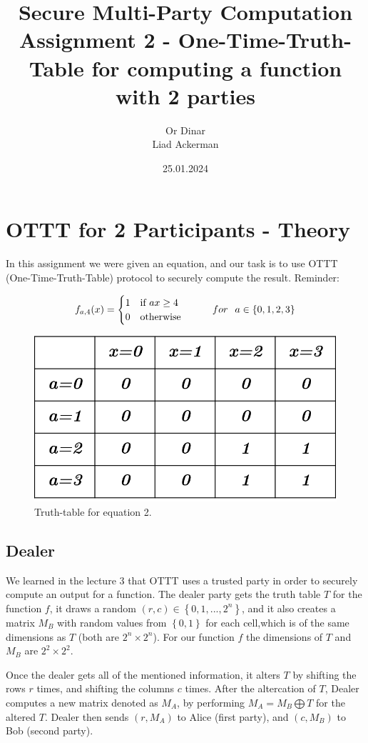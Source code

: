 \documentclass{article}
\title{\textbf{Secure Multi-Party Computation
} \hspace{10cm} 
Assignment 2 - One-Time-Truth-Table for computing a function with 2 parties\textbf{}}
\author{Or Dinar \\
Liad Ackerman}
\date{25.01.2024}
\begin{document}
\maketitle

\section{OTTT for 2 Participants - Theory}

In this assignment we were given an equation, and our task is to use OTTT (One-Time-Truth-Table) protocol to securely compute the result.
\newline
\newline
Reminder:

$$
f_{a,4}(x)=\begin{cases}
			1 & \text{if $ax \geq 4$ }\\
                0 & \text{otherwise}
		  \end{cases} \hspace{1cm} for \hspace{.25cm}a\in \left\{0,1,2,3\right\}
$$
\begin{figure}[H]
    \centering
    \includegraphics[width=0.5\linewidth]{Picture1.png}
    \caption{Truth-table for equation 2.}
    \label{fig:enter-label}
\end{figure}

\subsection{Dealer}
We learned in the lecture 3 that OTTT uses a trusted party in order to securely compute an output for a function. The dealer party gets the truth table $T$ for the function $f$, it draws a random $(r,c) \in \left\{0,1,...,2^n\right\}$, and it also creates a matrix $M_{B}$ 
 with random values from $\left\{0,1\right\}$ for each cell,which is of the same dimensions as $T$ (both are $2^n \times 2^n$). For our function $f$ the dimensions of $T$ and $M_B$ are $2^2 \times 2^2$.

Once the dealer gets all of the mentioned information, it alters $T$ by shifting the rows $r$ times, and shifting the columns $c$ times. After the altercation of $T$, Dealer computes a new matrix denoted as $M_A$, by performing $M_A = M_B \bigoplus T$ for the altered $T$. Dealer then sends $(r,M_A)$ to Alice (first party), and $(c,M_B)$ to Bob (second party).
\end{document}
